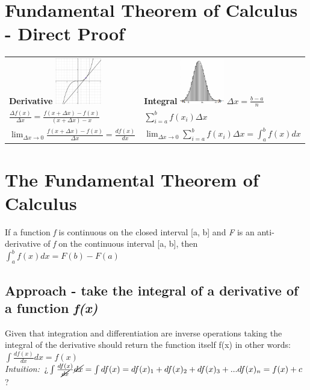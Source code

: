 \documentclass{article}
\author{Uzair Akram}
\begin{document}
\section*{Fundamental Theorem of Calculus - Direct Proof}

\begin{tabular}{l l}
\textbf{Derivative}  \hspace{2cm} \includegraphics[height=2cm]{assets/derivative.png} \hspace{2cm}  &  \textbf{Integral}   \hspace{2cm}  \includegraphics[height=2cm]{assets/integral.png}  $\Delta x = \frac{b - a}{n}$ \\
$\frac{\Delta f(x)}{\Delta x} = \frac{f(x + \Delta x) - f(x)}{(x + \Delta x) - x}$  &  $\sum\limits_{i=a}^b f(x_i)\Delta x$ \\
$\lim_{\Delta x\to 0} \frac{f(x + \Delta x) - f(x)}{\Delta x} = \frac{df(x)}{dx}$  &  $\lim_{\Delta x\to 0}\sum\limits_{i=a}^b f(x_i)\Delta x = \int_{a}^b f(x)dx$ \\
\end{tabular}

\section*{The Fundamental Theorem of Calculus}
If a function \emph{f} is continuous on the closed interval [a, b] and \emph{F} is an anti-derivative of \emph{f} on the continuous interval [a, b], then $\int_{a}^b f(x)dx = F(b) - F(a)$

\subsection*{Approach - take the integral of a derivative of a function \emph{f(x)}}
Given that integration and differentiation are inverse operations taking the integral of the derivative should return the function itself f(x) in other words:  $\int \frac{df(x)}{dx}dx = f(x)$ \\
\emph{Intuition: } %
$\text{?`}\int \frac{df(x)}{\cancel{dx}}\cancel{dx} = \int df(x) = df(x)_1 + df(x)_2 + df(x)_3 + ... df(x)_n = f(x) + c$ ? \\
\end{document}
